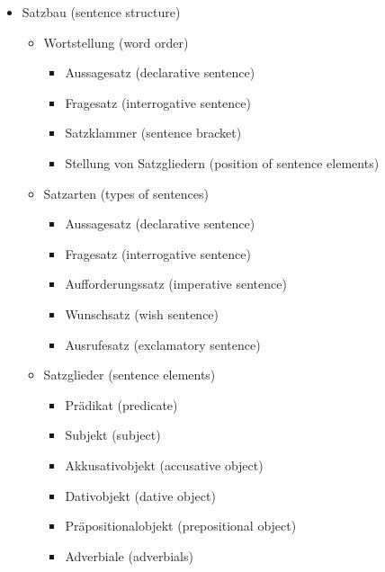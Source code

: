 \documentclass[a4paper]{article}
\begin{document}
\begin{itemize}
            \item Satzbau {\small (sentence structure)}
            \begin{itemize}
                \item Wortstellung {\small (word order)}
                \begin{itemize}
                    \item Aussagesatz {\small (declarative sentence)}
                    \item Fragesatz {\small (interrogative sentence)}
                    \item Satzklammer {\small (sentence bracket)}
                    \item Stellung von Satzgliedern {\small (position of sentence elements)}
                \end{itemize}
                
                \item Satzarten {\small (types of sentences)}
                \begin{itemize}
                    \item Aussagesatz {\small (declarative sentence)}
                    \item Fragesatz {\small (interrogative sentence)}
                    \item Aufforderungssatz {\small (imperative sentence)}
                    \item Wunschsatz {\small (wish sentence)}
                    \item Ausrufesatz {\small (exclamatory sentence)}
                \end{itemize}
                
                \item Satzglieder {\small (sentence elements)}
                \begin{itemize}
                    \item Prädikat {\small (predicate)}
                    \item Subjekt {\small (subject)}
                    \item Akkusativobjekt {\small (accusative object)}
                    \item Dativobjekt {\small (dative object)}
                    \item Präpositionalobjekt {\small (prepositional object)}
                    \item Adverbiale {\small (adverbials)}
                \end{itemize}
                

\end{itemize}
\end{itemize}
\end{document}
